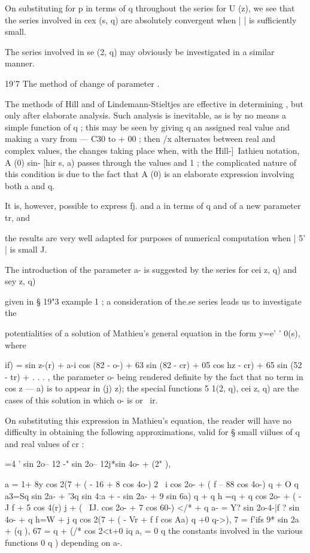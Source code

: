 {{On substituting for p in terms of q throughout the series for U (z), we see that the 
series involved in cex (s, q) are absolutely convergent when |   | is sufficiently small. 

The series involved in se  (2, q) may obviously be investigated in a similar manner. 

19'7 The method of change of parameter .  

The methods of Hill and of Lindemann-Stieltjes are effective in determining  , but 
only after elaborate analysis. Such analysis is inevitable, as   is by no means a simple 
function of q ; this may be seen by giving q an assigned real value and making a vary 
from — C30 to + 00 ; then /x alternates between real and complex values, the changes taking 
place when, with the Hill-]\ Iathieu notation, A (0) sin- [hir s, a) passes through the values 
and 1 ; the complicated nature of this condition is due to the fact that A (0) is an 
elaborate expression involving both a and q. 

It is, however, possible to express fj. and a in terms of q and of a new parameter tr, and 

the results are very well adapted for purposes of numerical computation when | 5' | is small J. 

The introduction of the parameter a- is suggested by the series for cei  z, q) and sey  z, q) 

given in § 19"3 example 1 ; a consideration of the.se series leads us to investigate the 

potentialities of a solution of Mathieu's general equation in the form y=e' ' 0(s), where 

  if) = sin  z-(r) + a-i cos (82 - o-) + 63 sin (82 - cr) + 05 cos  hz - cr) + 65 sin (52 - tr) + . . . , 
the parameter o- being rendered definite by the fact that no term in cos  z — a) is to appear 
in (j) z); the special functions 5 1(2, q), cei z, q) are the cases of this solution in which 
o- is or \ ir. 

On substituting this expression in Mathieu's equation, the reader will have no difficulty 
in obtaining the following approximations, valid for § small viilues of q and real values 
of cr : 

  =4 ' sin 2o-- 12 -" sin 2o-- 12j*sin 4o- + (2" ), 

a = 1+ 8y cos 2(7 + ( - 16 + 8 cos 4o-)  2 \    i cos 2o- + ( f  -- 88 cos 4o-) q  + O  q%
a3=Sq  sin 2a- + '3q  sin 4:a  +  -  sin 2a- + 9 sin 6a) q  +  q%
h =q + q  cos 2o- + ( - J f + 5 cos 4(r) j  + ( \  IJ. cos 2o- + 7 cos 60-) </* +  q%
a- = Y?  sin 2o-4-|f ?  sin 4o- +  q%
h=W +  j q  cos 2(7 + ( - Vr + f f cos Aa) q +0  q->), 
 7 = f'ifs 9* sin 2a + (q ), 67 =  q  +   (/* cos 2<t+0 iq%
a, = 0 q%
the constants involved in the various functions 0 q ) depending on a-. 

}}
